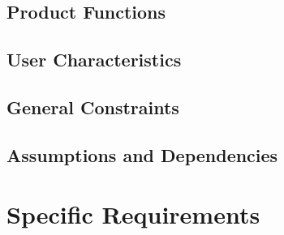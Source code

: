 \documentclass[11pt]{article}
\theoremstyle{definition}
\begin{document}
\subsection{Product Functions}

\subsection{User Characteristics}

\subsection{General Constraints}

\subsection{Assumptions and Dependencies}

\section{Specific Requirements}


\printbibliography
\end{document}
